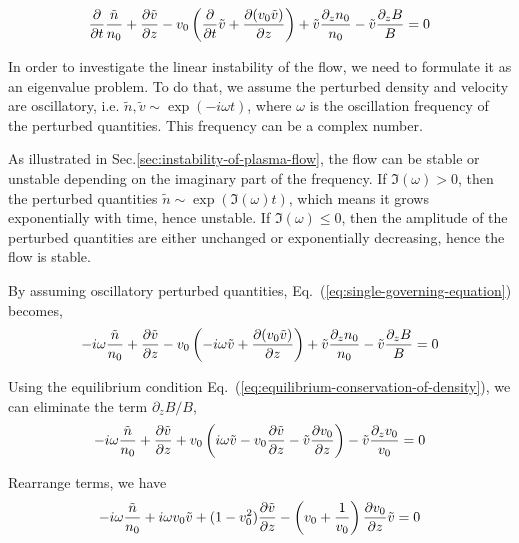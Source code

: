 \begin{equation} \label{eq:single-governing-equation}
	\pdv{t}\frac{\tilde{n}}{n_0}
	+ \pdv{\tilde{v}}{z} - v_0\left(\pdv{t}\tilde{v}
	+ \pdv{(v_0\tilde{v})}{z}\right)
	+ \tilde{v}\frac{\partial_z n_0}{n_0}
	- \tilde{v}\frac{\partial_z B}{B}
	= 0
\end{equation}

In order to investigate the linear instability of the flow, we need to formulate it as an eigenvalue problem. To do that, we assume the perturbed density and velocity are oscillatory, i.e. $\tilde{n}, \tilde{v} \sim \exp(-i\omega t)$, where $\omega$ is the oscillation frequency of the perturbed quantities. This frequency can be a complex number.

As illustrated in Sec.\ref{sec:instability-of-plasma-flow}, the flow can be stable or unstable depending on the imaginary part of the frequency. If $\Im(\omega) > 0$, then the perturbed quantities $\tilde{n} \sim \exp(\Im(\omega) t)$, which means it grows exponentially with time, hence unstable. If $\Im(\omega) \leq 0$, then the amplitude of the perturbed quantities are either unchanged or exponentially decreasing, hence the flow is stable.

By assuming oscillatory perturbed quantities, Eq.~(\ref{eq:single-governing-equation}) becomes,
\begin{equation}
	-i\omega\frac{\tilde{n}}{n_0}
	+ \pdv{\tilde{v}}{z} - v_0\left(-i\omega\tilde{v}
	+ \pdv{(v_0\tilde{v})}{z}\right)
	+ \tilde{v}\frac{\partial_z n_0}{n_0}
	- \tilde{v}\frac{\partial_z B}{B}
	= 0
\end{equation}

Using the equilibrium condition Eq.~(\ref{eq:equilibrium-conservation-of-density}), we can eliminate the term $\partial_z B/B$,
\[
	-i\omega\frac{\tilde{n}}{n_0}
	+ \pdv{\tilde{v}}{z}
	+ v_0\left(i\omega \tilde{v} - v_0\pdv{\tilde{v}}{z} - \tilde{v}\pdv{v_0}{z} \right)
	- \tilde{v}\frac{\partial_z v_0}{v_0}
	= 0
\]

Rearrange terms, we have
\begin{equation}
	-i\omega\frac{\tilde{n}}{n_0}
	+ i\omega v_0\tilde{v}
	+ (1-v_0^2)\pdv{\tilde{v}}{z}
	- \left(v_0+\frac{1}{v_0}\right)\pdv{v_0}{z}\tilde{v} = 0
	\label{eq:intermediate-step-time-derivative-of-Y}
\end{equation}

